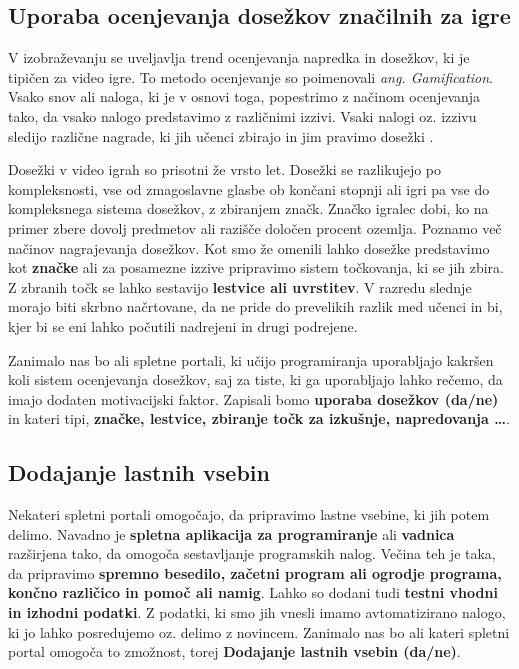 \subsection{Uporaba ocenjevanja dosežkov značilnih za igre}
\label{sec:uporaba_dosežkov}

V izobraževanju se uveljavlja trend ocenjevanja napredka in dosežkov,
ki je tipičen za video igre. To metodo ocenjevanje so poimenovali
\emph{ang. Gamification}. Vsako snov ali naloga, ki je v osnovi toga,
popestrimo z načinom ocenjevanja tako, da vsako nalogo predstavimo z
različnimi izzivi. Vsaki nalogi oz. izzivu sledijo različne nagrade,
ki jih učenci zbirajo in jim pravimo dosežki \cite{web:edublogger}.

Dosežki v video igrah so prisotni že vrsto let. Dosežki se razlikujejo
po kompleksnosti, vse od zmagoslavne glasbe ob končani stopnji ali
igri pa vse do kompleksnega sistema dosežkov, z zbiranjem
značk. Značko igralec dobi, ko na primer zbere dovolj predmetov ali
razišče določen procent ozemlja. Poznamo več načinov nagrajevanja
dosežkov. Kot smo že omenili lahko dosežke predstavimo kot
\textbf{značke} ali za posamezne izzive pripravimo sistem točkovanja,
ki se jih zbira. Z zbranih točk se lahko sestavijo \textbf{lestvice
  ali uvrstitev}. V razredu slednje morajo biti skrbno načrtovane, da
ne pride do prevelikih razlik med učenci in bi, kjer bi se eni lahko
počutili nadrejeni in drugi podrejene.

Zanimalo nas bo ali spletne portali, ki učijo programiranja
uporabljajo kakršen koli sistem ocenjevanja dosežkov, saj za tiste, ki
ga uporabljajo lahko rečemo, da imajo dodaten motivacijski
faktor. Zapisali bomo \textbf{uporaba dosežkov (da/ne)} in kateri tipi,
\textbf{značke, lestvice, zbiranje točk za izkušnje, napredovanja \dots}.

\subsection{Dodajanje lastnih vsebin}
\label{sec:dodajanje_vsebin}

Nekateri spletni portali omogočajo, da pripravimo lastne vsebine, ki
jih potem delimo. Navadno je \textbf{spletna aplikacija za
  programiranje} ali \textbf{vadnica} razširjena tako, da omogoča
sestavljanje programskih nalog. Večina teh je taka, da pripravimo
\textbf{spremno besedilo, začetni program ali ogrodje programa, končno
  različico in pomoč ali namig}. Lahko so dodani tudi \textbf{testni
  vhodni in izhodni podatki}. Z podatki, ki smo jih vnesli imamo
avtomatizirano nalogo, ki jo lahko posredujemo oz. delimo z
novincem. Zanimalo nas bo ali kateri spletni portal omogoča to
zmožnost, torej \textbf{Dodajanje lastnih vsebin (da/ne)}.

